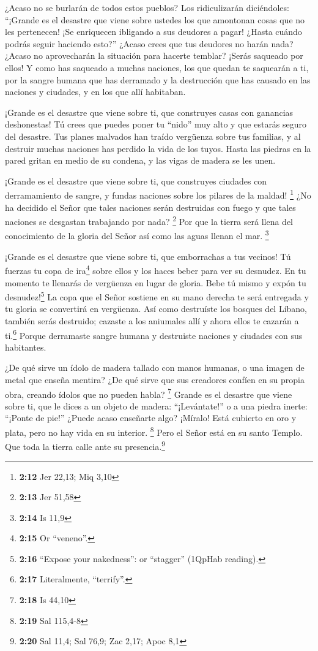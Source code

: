  ¿Acaso no se burlarán de todos estos pueblos? Los
ridiculizarán diciéndoles: ``¡Grande es el desastre que viene sobre
ustedes los que amontonan cosas que no les pertenecen! ¡Se enriquecen
ibligando a sus deudores a pagar! ¿Hasta cuándo podrás seguir haciendo
esto?''  ¿Acaso crees que tus deudores no harán nada?
¿Acaso no aprovecharán la situación para hacerte temblar? ¡Serás
saqueado por ellos!  Y como has saqueado a muchas
naciones, los que quedan te saquearán a ti, por la sangre humana que has
derramado y la destrucción que has causado en las naciones y ciudades, y
en los que allí habitaban.

 ¡Grande es el desastre que viene sobre ti, que construyes
casas con ganancias deshonestas! Tú crees que puedes poner tu ``nido''
muy alto y que estarás seguro del desastre.  Tus planes
malvados han traído vergüenza sobre tus familias, y al destruir muchas
naciones has perdido la vida de los tuyos.  Hasta las
piedras en la pared gritan en medio de su condena, y las vigas de madera
se les unen.

 ¡Grande es el desastre que viene sobre ti, que
construyes ciudades con derramamiento de sangre, y fundas naciones sobre
los pilares de la maldad! \footnote{\textbf{2:12} Jer 22,13; Miq 3,10}
 ¿No ha decidido el Señor que tales naciones serán
destruidas con fuego y que tales naciones se desgastan trabajando por
nada? \footnote{\textbf{2:13} Jer 51,58}  Por que la
tierra será llena del conocimiento de la gloria del Señor así como las
aguas llenan el mar. \footnote{\textbf{2:14} Is 11,9}

 ¡Grande es el desastre que viene sobre ti, que
emborrachas a tus vecinos! Tú fuerzas tu copa de ira\footnote{\textbf{2:15}
  Or ``veneno''.} sobre ellos y los haces beber para ver su desnudez.
 En tu momento te llenarás de vergüenza en lugar de
gloria. Bebe tú mismo y expón tu desnudez!\footnote{\textbf{2:16}
  ``Expose your nakedness'': or ``stagger'' (1QpHab reading).} La copa
que el Señor sostiene en su mano derecha te será entregada y tu gloria
se convertirá en vergüenza.  Así como destruíste los
bosques del Líbano, también serás destruido; cazaste a los aniumales
allí y ahora ellos te cazarán a ti.\footnote{\textbf{2:17} Literalmente,
  ``terrify''.} Porque derramaste sangre humana y destruiste naciones y
ciudades con sus habitantes.

 ¿De qué sirve un ídolo de madera tallado con manos
humanas, o una imagen de metal que enseña mentira? ¿De qué sirve que sus
creadores confíen en su propia obra, creando ídolos que no pueden habla?
\footnote{\textbf{2:18} Is 44,10}  Grande es el desastre
que viene sobre ti, que le dices a un objeto de madera: ``¡Levántate!''
o a una piedra inerte: ``¡Ponte de pie!'' ¿Puede acaso enseñarte algo?
¡Míralo! Está cubierto en oro y plata, pero no hay vida en su interior.
\footnote{\textbf{2:19} Sal 115,4-8}  Pero el Señor está
en su santo Templo. Que toda la tierra calle ante su
presencia.\footnote{\textbf{2:20} Sal 11,4; Sal 76,9; Zac 2,17; Apoc 8,1}

